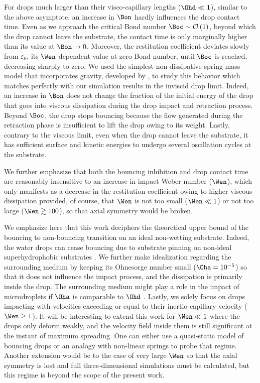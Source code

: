 For drops much larger than their visco-capillary lengths ($\Ohd \ll 1$), similar to the above asymptote, an increase in $\Bon$ hardly influences the drop contact time. Even as we approach the critical Bond number $\Boc \sim \mathcal{O}\left(1\right)$, beyond which the drop cannot leave the substrate, the contact time is only marginally higher than its value at $\Bon \to 0$. Moreover, the restitution coefficient deviates slowly from $\varepsilon_0$, its $\Wen$-dependent value at zero Bond number, until $\Boc$ is reached, decreasing sharply to zero. We used the simplest non-dissipative spring-mass model that incorporates gravity, developed by \citet{biance2006}, to study this behavior which matches perfectly with our simulation results in the inviscid drop limit. Indeed, an increase in $\Bon$ does not change the fraction of the initial energy of the drop that goes into viscous dissipation during the drop impact and retraction process. Beyond $\Boc$, the drop stops bouncing because the flow generated during the retraction phase is insufficient to lift the drop owing to its weight. Lastly, contrary to the viscous limit, even when the drop cannot leave the substrate, it has sufficient surface and kinetic energies to undergo several oscillation cycles at the substrate. 

We further emphasize that both the bouncing inhibition and drop contact time are reasonably insensitive to an increase in impact Weber number ($\Wen$), which only manifests as a decrease in the restitution coefficient owing to higher viscous dissipation provided, of course, that $\Wen$ is not too small ($\Wen \ll 1$) or not too large ($\Wen \gtrsim 100$), so that axial symmetry would be broken. 

We emphasize here that this work deciphers the theoretical upper bound of the bouncing to non-bouncing transition on an ideal non-wetting substrate. Indeed, the water drops can cease bouncing due to substrate pinning on non-ideal superhydrophobic substrates \citep{sarma2022interfacial}. We further make idealization regarding the surrounding medium by keeping its Ohnesorge number small ($\Oha = 10^{-5}$) so that it does not influence the impact process, and the dissipation is primarily inside the drop. The surrounding medium might play a role in the impact of microdroplets if $\Oha$ is comparable to $\Ohd$ \citep{kolinski2014drops, tai2021research}. Lastly, we solely focus on drops impacting with velocities exceeding or equal to their inertio-capillary velocity ($\Wen \ge 1$). It will be interesting to extend this work for $\Wen \ll 1$ where the drops only deform weakly, and the velocity field inside them is still significant at the instant of maximum spreading. One can either use a quasi-static model of bouncing drops \citep{molavcek2012quasi} or an analogy with non-linear springs \citep{chevy2012liquid} to probe that regime. Another extension would be to the case of very large $\Wen$ so that the axial symmetry is lost and full three-dimensional simulations must be calculated, but this regime is beyond the scope of the present work.

